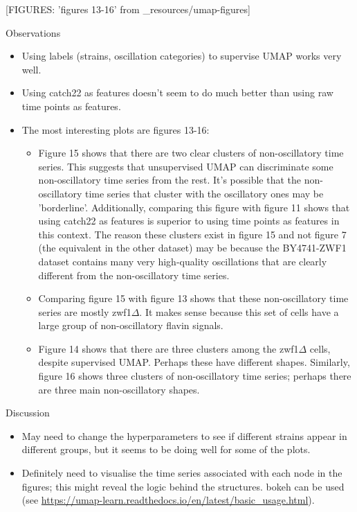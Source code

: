 
[FIGURES: 'figures 13-16' from \_resources/umap-figures]

Observations
\begin{itemize}
\item Using labels (strains, oscillation categories) to supervise UMAP works very well.
\item Using catch22 as features doesn't seem to do much better than using raw time points as features.
\item The most interesting plots are figures 13-16:
\begin{itemize}
\item Figure 15 shows that there are two clear clusters of non-oscillatory time series.  This suggests that unsupervised UMAP can discriminate some non-oscillatory time series from the rest.  It's possible that the non-oscillatory time series that cluster with the oscillatory ones may be 'borderline'.  Additionally, comparing this figure with figure 11 shows that using catch22 as features is superior to using time points as features in this context.  The reason these clusters exist in figure 15 and not figure 7 (the equivalent in the other dataset) may be because the BY4741-ZWF1 dataset contains many very high-quality oscillations that are clearly different from the non-oscillatory time series.
\item Comparing figure 15 with figure 13 shows that these non-oscillatory time series are mostly zwf1$\Delta$.  It makes sense because this set of cells have a large group of non-oscillatory flavin signals.
\item Figure 14 shows that there are three clusters among the zwf1$\Delta$ cells, despite supervised UMAP.  Perhaps these have different shapes.  Similarly, figure 16 shows three clusters of non-oscillatory time series; perhaps there are three main non-oscillatory shapes.
\end{itemize}
\end{itemize}

Discussion
\begin{itemize}
\item May need to change the hyperparameters to see if different strains appear in different groups, but it seems to be doing well for some of the plots.
\item Definitely need to visualise the time series associated with each node in the figures; this might reveal the logic behind the structures.  bokeh can be used (see \url{https://umap-learn.readthedocs.io/en/latest/basic\_usage.html}).
\end{itemize}

